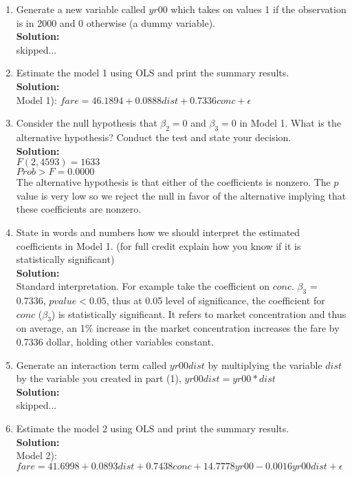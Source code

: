 \documentclass[12pt]{article}
\begin{document}
\begin{enumerate}[(1)]
\item Generate a new variable called $yr00$ which takes on values 1 if the observation is in 2000 and 0 otherwise (a dummy variable).
\smallskip\\
{\bf Solution:\\}
skipped...


\item Estimate the model 1 using OLS and print the summary results.
\smallskip\\
{\bf Solution:\\}
Model 1):  $fare = 46.1894 + 0.0888dist+ 0.7336conc + \epsilon$



\item Consider the null hypothesis that $\beta_2 = 0$ and $\beta_3 = 0$ in Model 1. What is the alternative hypothesis? Conduct the test and state your decision. 
\smallskip\\
{\bf Solution:\\} 
$F( 2, 4593) = 1633$\\
$Prob > F = 0.0000$\\
The alternative hypothesis is that either of the coefficients is nonzero. The $p$ value is very low so we reject the null in favor of the alternative implying that these coefficients are nonzero.



\item State in words and numbers how we should interpret the estimated coefficients in Model 1. (for full credit explain how you know if it is statistically signiﬁcant) 
\smallskip\\
{\bf Solution:\\} 
Standard interpretation. For example take the coefficient on $conc$. $\beta_3$ = 0.7336, $p value < 0.05$, thus at 0.05 level of significance, the coefficient for $conc$ ($\beta_3$) is statistically significant. It refers to market concentration and thus on average, an 1\% increase in the market concentration increases the fare by 0.7336 dollar, holding other variables constant.


\item Generate an interaction term called $yr00dist$ by multiplying the variable $dist$ by the variable you created in part (1), $yr00dist = yr00 * dist$
\smallskip\\
{\bf Solution:\\}
skipped...


\item Estimate the model 2 using OLS and print the summary results.
\smallskip\\
{\bf Solution:\\}
Model 2):  $fare = 41.6998 + 0.0893dist + 0.7438conc + 14.7778yr00 - 0.0016yr00dist + \epsilon$



\end{enumerate}
\end{document}
